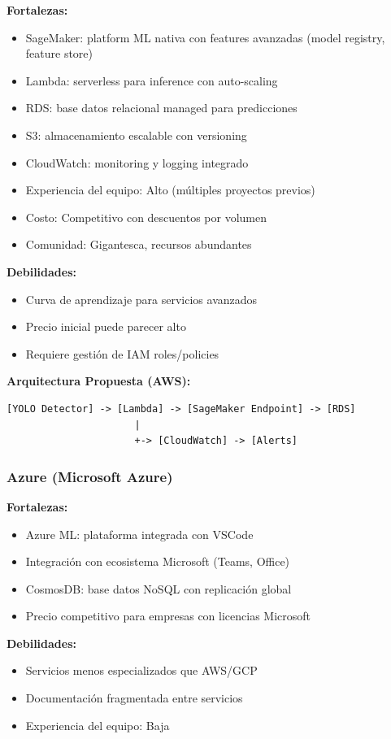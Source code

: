 \documentclass[11pt,letterpaper]{article}
\begin{document}
\textbf{Fortalezas:}
\begin{itemize}
  \item SageMaker: platform ML nativa con features avanzadas (model registry, feature store)
  \item Lambda: serverless para inference con auto-scaling
  \item RDS: base datos relacional managed para predicciones
  \item S3: almacenamiento escalable con versioning
  \item CloudWatch: monitoring y logging integrado
  \item Experiencia del equipo: Alto (múltiples proyectos previos)
  \item Costo: Competitivo con descuentos por volumen
  \item Comunidad: Gigantesca, recursos abundantes
\end{itemize}

\textbf{Debilidades:}
\begin{itemize}
  \item Curva de aprendizaje para servicios avanzados
  \item Precio inicial puede parecer alto
  \item Requiere gestión de IAM roles/policies
\end{itemize}

\textbf{Arquitectura Propuesta (AWS):}
\begin{verbatim}
[YOLO Detector] -> [Lambda] -> [SageMaker Endpoint] -> [RDS]
                      |
                      +-> [CloudWatch] -> [Alerts]
\end{verbatim}

\subsubsection{Azure (Microsoft Azure)}

\textbf{Fortalezas:}
\begin{itemize}
  \item Azure ML: plataforma integrada con VSCode
  \item Integración con ecosistema Microsoft (Teams, Office)
  \item CosmosDB: base datos NoSQL con replicación global
  \item Precio competitivo para empresas con licencias Microsoft
\end{itemize}

\textbf{Debilidades:}
\begin{itemize}
  \item Servicios menos especializados que AWS/GCP
  \item Documentación fragmentada entre servicios
  \item Experiencia del equipo: Baja
\end{itemize}
\end{document}
